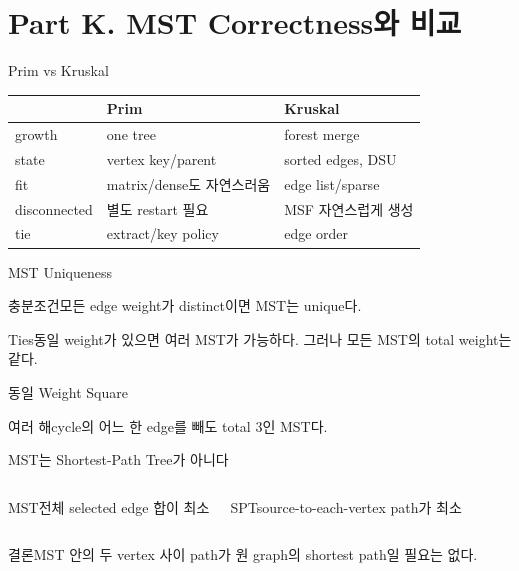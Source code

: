 \section{Part K. MST Correctness와 비교}
\begin{frame}{Prim vs Kruskal}
\scriptsize\centering\begin{tabular}{lll}\toprule&Prim&Kruskal\\\midrule
growth&one tree&forest merge\\state&vertex key/parent&sorted edges, DSU\\fit&matrix/dense도 자연스러움&edge list/sparse\\disconnected&별도 restart 필요&MSF 자연스럽게 생성\\tie&extract/key policy&edge order\\\bottomrule\end{tabular}
\end{frame}
\begin{frame}{MST Uniqueness}
\begin{block}{충분조건}모든 edge weight가 distinct이면 MST는 unique다.\end{block}
\begin{block}{Ties}동일 weight가 있으면 여러 MST가 가능하다. 그러나 모든 MST의 total weight는 같다.\end{block}
\end{frame}
\begin{frame}{동일 Weight Square}
\centering{}
\begin{block}{여러 해}cycle의 어느 한 edge를 빼도 total 3인 MST다.\end{block}
\end{frame}
\begin{frame}{MST는 Shortest-Path Tree가 아니다}
\begin{columns}[T]\begin{block}{MST}전체 selected edge 합이 최소\end{block}
\begin{block}{SPT}source-to-each-vertex path가 최소\end{block}\end{columns}
\begin{alertblock}{결론}MST 안의 두 vertex 사이 path가 원 graph의 shortest path일 필요는 없다.\end{alertblock}
\end{frame}

